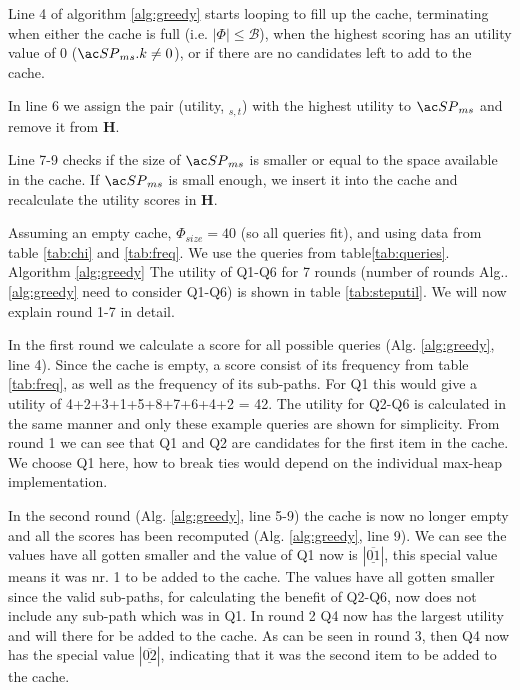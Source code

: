 Line 4 of algorithm \ref{alg:greedy} starts looping to fill up the cache, terminating when either the cache is full (i.e. $| \Phi | \leq  \mathcal{B}$), when the highest scoring \spath has an utility value of 0 ($\spath_{ms}.k \neq 0$), or if there are no \spath candidates left to add to the cache.




In line 6 we assign the pair (utility, \spath$_{s,t}$) with the highest utility to $\spath_{ms}$ and remove it from \textbf{H}.


Line 7-9 checks if the size of $\spath_{ms}$ is smaller or equal to the space available in the cache. If $\spath_{ms}$ is small enough, we insert it into the cache and recalculate the utility scores in \textbf{H}.


Assuming an empty cache, $\Phi_{size}=40$ (so all queries fit), and using data from table \ref{tab:chi} and  \ref{tab:freq}. We use the queries from table\ref{tab:queries}. Algorithm \ref{alg:greedy}  The utility of Q1-Q6 for 7 rounds (number of rounds Alg.. \ref{alg:greedy} need to consider Q1-Q6) is shown in table \ref{tab:steputil}. We will now explain round 1-7 in detail.


In the first round we calculate a score for all possible queries (Alg. \ref{alg:greedy}, line 4). Since the cache is empty, a \spath score consist of its frequency from table \ref{tab:freq}, as well as the frequency of its sub-paths. For Q1 this would give a utility of 4+2+3+1+5+8+7+6+4+2 = 42. The utility for Q2-Q6 is calculated in the same manner and only these example queries are shown for simplicity. From round 1 we can see that Q1 and Q2 are candidates for the first item in the cache. We choose Q1 here, how to break ties would depend on the individual max-heap implementation. 


In the second round (Alg. \ref{alg:greedy}, line 5-9) the cache is now no longer empty and all the scores has been recomputed (Alg. \ref{alg:greedy}, line 9). We can see the values have all gotten smaller and the value of Q1 now is $| \underline{\overline{01}}|$, this special value means it was nr. 1 to be added to the cache. The values have all gotten smaller since the valid sub-paths, for calculating the benefit of Q2-Q6, now does not include any sub-path which was in Q1. In round 2 Q4 now has the largest utility and will there for be added to the cache. As can be seen in round 3, then Q4 now has the special value $|\underline{\overline{02}}|$, indicating that it was the second item to be added to the cache.


